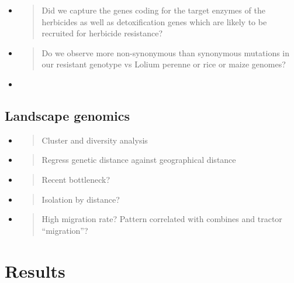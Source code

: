 \begin{itemize}
\item
  \begin{quote}
  Did we capture the genes coding for the target enzymes of the
  herbicides as well as detoxification genes which are likely to be
  recruited for herbicide resistance?
  \end{quote}
\item
  \begin{quote}
  Do we observe more non-synonymous than synonymous mutations in our
  resistant genotype vs Lolium perenne or rice or maize genomes?
  \end{quote}
\item
\end{itemize}

\hypertarget{landscape-genomics}{%
\subsection{Landscape genomics}\label{landscape-genomics}}

\begin{itemize}
\item
  \begin{quote}
  Cluster and diversity analysis
  \end{quote}
\item
  \begin{quote}
  Regress genetic distance against geographical distance
  \end{quote}
\item
  \begin{quote}
  Recent bottleneck?
  \end{quote}
\item
  \begin{quote}
  Isolation by distance?
  \end{quote}
\item
  \begin{quote}
  High migration rate? Pattern correlated with combines and tractor
  ``migration''?
  \end{quote}
\end{itemize}

\hypertarget{section}{%
\section{\texorpdfstring{\hfill\break
}{ }}\label{section}}

\hypertarget{results}{%
\section{Results}\label{results}}

